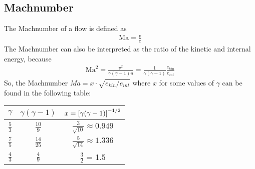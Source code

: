 \subsection{Machnumber}
The Machnumber of a flow is defined as
\begin{align}
\text{Ma}=\frac{v}{c}
\end{align}
The Machnumber can also be interpreted as the ratio of the kinetic and internal 
energy, because
\begin{align}
\text{Ma}^2=\frac{v^2}{\gamma(\gamma-1) u}=\frac{1}{\gamma(\gamma-1)}\frac{e_{kin}}{e_{int}}
\end{align}
So, the Machnumber $Ma = x \cdot \sqrt{e_{kin}/e_{int}}$ where $x$ for some 
values of $\gamma$ can be found in the following table:  
\begin{center}
\begin{tabular}{ccc}
$\gamma$ & $\gamma(\gamma-1)$ & $x = { \left[ \gamma(\gamma-1) \right] }^{-1/2}$ \\ 
\hline
\hline
$\frac{5}{3}$ & $\frac{10}{9}$ & $\frac{3}{\sqrt{10}}\approx 0.949$ \\  
$\frac{7}{5}$ & $\frac{14}{25}$ & $\frac{5}{\sqrt{14}}\approx 1.336$ \\  
$\frac{4}{3}$ & $\frac{4}{9}$ &  $\frac{3}{2}$ = 1.5\\ 
\hline 
\end{tabular}
\end{center} 

